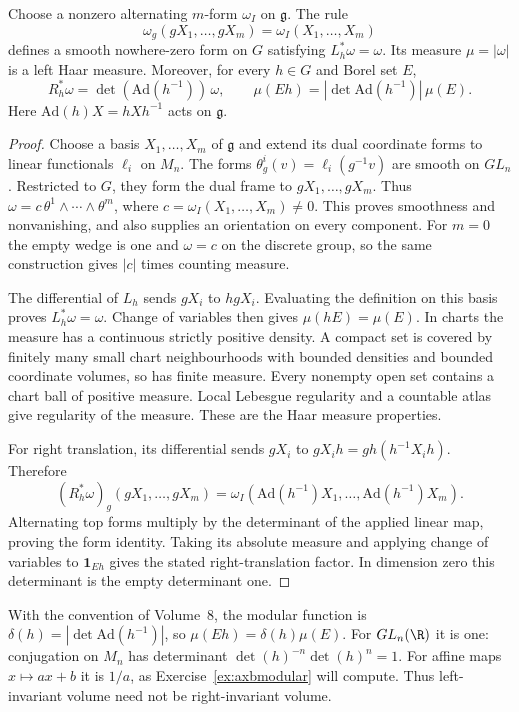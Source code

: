 \begin{theorem}\label{thm:haarform}
Choose a nonzero alternating $m$-form $\omega_I$ on $\mathfrak g$.
The rule
\[
 \omega_g(gX_1,\ldots,gX_m)=\omega_I(X_1,\ldots,X_m)
\]
defines a smooth nowhere-zero form on $G$ satisfying $L_h^*\omega=\omega$.
Its measure $\mu=|\omega|$ is a left Haar measure.
Moreover, for every $h\in G$ and Borel set $E$,
\[
 R_h^*\omega=\det(\mathrm{Ad}(h^{-1}))\,\omega,\qquad
 \mu(Eh)=|\det\mathrm{Ad}(h^{-1})|\,\mu(E).
\]
Here $\mathrm{Ad}(h)X=hXh^{-1}$ acts on $\mathfrak g$.
\end{theorem}
\begin{proof}
Choose a basis $X_1,\ldots,X_m$ of $\mathfrak g$ and extend its dual
coordinate forms to linear functionals $\ell_i$ on $M_n$.
The forms $\theta^i_g(v)=\ell_i(g^{-1}v)$ are smooth on $GL_n$.
Restricted to $G$, they form the dual frame to $gX_1,\ldots,gX_m$.
Thus
$\omega=c\,\theta^1\wedge\cdots\wedge\theta^m$,
where $c=\omega_I(X_1,\ldots,X_m)\ne0$.
This proves smoothness and nonvanishing, and also supplies an orientation
on every component. For $m=0$ the empty wedge is one and $\omega=c$
on the discrete group, so the same construction gives $|c|$ times counting
measure.

The differential of $L_h$ sends $gX_i$ to $hgX_i$.
Evaluating the definition on this basis proves $L_h^*\omega=\omega$.
Change of variables then gives $\mu(hE)=\mu(E)$.
In charts the measure has a continuous strictly positive density.
A compact set is covered by finitely many small chart neighbourhoods
with bounded densities and bounded coordinate volumes, so has finite
measure. Every nonempty open set contains a chart ball of positive
measure. Local Lebesgue regularity and a countable atlas give regularity
of the measure. These are the Haar measure properties.

For right translation, its differential sends $gX_i$ to
$gX_ih=gh(h^{-1}X_ih)$. Therefore
\[
 (R_h^*\omega)_g(gX_1,\ldots,gX_m)
 =\omega_I(\mathrm{Ad}(h^{-1})X_1,\ldots,
             \mathrm{Ad}(h^{-1})X_m).
\]
Alternating top forms multiply by the determinant of the applied linear
map, proving the form identity. Taking its absolute measure and applying
change of variables to $\mathbf1_{Eh}$ gives the stated right-translation
factor. In dimension zero this determinant is the empty determinant one.
\end{proof}

With the convention of Volume~8, the modular function is
$\delta(h)=|\det\mathrm{Ad}(h^{-1})|$, so $\mu(Eh)=\delta(h)\mu(E)$.
For $GL_n(\R)$ it is one: conjugation on $M_n$ has determinant
$\det(h)^{-n}\det(h)^n=1$.
For affine maps $x\mapsto ax+b$ it is $1/a$, as
Exercise~\ref{ex:axbmodular} will compute. Thus left-invariant volume
need not be right-invariant volume.

